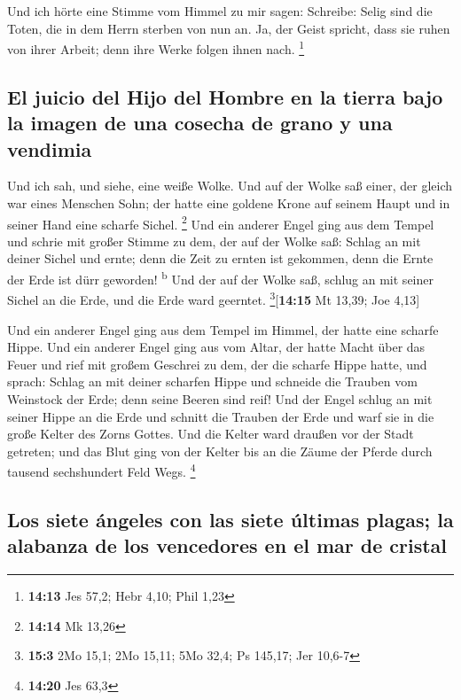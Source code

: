  Und ich hörte eine Stimme vom Himmel zu mir sagen:
Schreibe: Selig sind die Toten, die in dem Herrn sterben von nun an. Ja,
der Geist spricht, dass sie ruhen von ihrer Arbeit; denn ihre Werke
folgen ihnen nach. \footnote{\textbf{14:13} Jes 57,2; Hebr 4,10; Phil
  1,23}

\hypertarget{el-juicio-del-hijo-del-hombre-en-la-tierra-bajo-la-imagen-de-una-cosecha-de-grano-y-una-vendimia}{%
\subsection{El juicio del Hijo del Hombre en la tierra bajo la imagen de
una cosecha de grano y una
vendimia}\label{el-juicio-del-hijo-del-hombre-en-la-tierra-bajo-la-imagen-de-una-cosecha-de-grano-y-una-vendimia}}

 Und ich sah, und siehe, eine weiße Wolke. Und auf der
Wolke saß einer, der gleich war eines Menschen Sohn; der hatte eine
goldene Krone auf seinem Haupt und in seiner Hand eine scharfe Sichel.
\footnote{\textbf{14:14} Mk 13,26}  Und ein anderer Engel
ging aus dem Tempel und schrie mit großer Stimme zu dem, der auf der
Wolke saß: Schlag an mit deiner Sichel und ernte; denn die Zeit zu
ernten ist gekommen, denn die Ernte der Erde ist dürr geworden!
\textsuperscript{b}  Und der auf der Wolke saß, schlug an
mit seiner Sichel an die Erde, und die Erde ward geerntet.
\footnote{\textbf{15:3} 2Mo 15,1; 2Mo 15,11; 5Mo 32,4; Ps 145,17; Jer
  10,6-7}{[}\textbf{14:15} Mt 13,39; Joe 4,13{]}

 Und ein anderer Engel ging aus dem Tempel im Himmel, der
hatte eine scharfe Hippe.  Und ein anderer Engel ging aus
vom Altar, der hatte Macht über das Feuer und rief mit großem Geschrei
zu dem, der die scharfe Hippe hatte, und sprach: Schlag an mit deiner
scharfen Hippe und schneide die Trauben vom Weinstock der Erde; denn
seine Beeren sind reif!  Und der Engel schlug an mit
seiner Hippe an die Erde und schnitt die Trauben der Erde und warf sie
in die große Kelter des Zorns Gottes.  Und die Kelter
ward draußen vor der Stadt getreten; und das Blut ging von der Kelter
bis an die Zäume der Pferde durch tausend sechshundert Feld Wegs.
\footnote{\textbf{14:20} Jes 63,3}

\hypertarget{los-siete-uxe1ngeles-con-las-siete-uxfaltimas-plagas-la-alabanza-de-los-vencedores-en-el-mar-de-cristal}{%
\subsection{Los siete ángeles con las siete últimas plagas; la alabanza
de los vencedores en el mar de
cristal}\label{los-siete-uxe1ngeles-con-las-siete-uxfaltimas-plagas-la-alabanza-de-los-vencedores-en-el-mar-de-cristal}}

